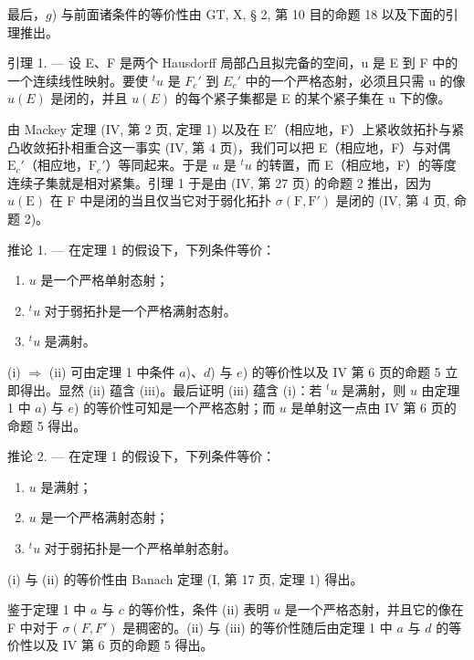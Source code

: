 最后，\(g\)) 与前面诸条件的等价性由 GT, X, § 2, 第 10 目的命题 18 以及下面的引理推出。

引理 1. --- 设 E、F 是两个 Hausdorff 局部凸且拟完备的空间，u 是 E 到 F 中的一个连续线性映射。要使 \({}^t u\) 是 \(F_{c}'\) 到 \(E_{c}'\) 中的一个严格态射，必须且只需 u 的像 \(u(E)\) 是闭的，并且 \(u(E)\) 的每个紧子集都是 E 的某个紧子集在 u 下的像。

由 Mackey 定理 (IV, 第 2 页, 定理 1) 以及在 \(\mathrm{E}'\)（相应地，F）上紧收敛拓扑与紧凸收敛拓扑相重合这一事实 (IV, 第 4 页)，我们可以把 E（相应地，F）与对偶 \(\mathrm{E}_c'\)（相应地，\(\mathrm{F}_c'\)）等同起来。于是 \(u\) 是 \({}^t u\) 的转置，而 E（相应地，F）的等度连续子集就是相对紧集。引理 1 于是由 (IV, 第 27 页) 的命题 2 推出，因为 \(u(\mathrm{E})\) 在 F 中是闭的当且仅当它对于弱化拓扑 \(\sigma(\mathrm{F}, \mathrm{F}')\) 是闭的 (IV, 第 4 页, 命题 2)。

推论 1. --- 在定理 1 的假设下，下列条件等价：

\begin{enumerate}
\def\labelenumi{(\roman{enumi})}
\item
  \(u\) 是一个严格单射态射；
\item
  \({}^{t}u\) 对于弱拓扑是一个严格满射态射。
\item
\({}^{t}u\) 是满射。
\end{enumerate}

(i) \(\Rightarrow\) (ii) 可由定理 1 中条件 \(a\))、\(d\)) 与 \(e\)) 的等价性以及 IV 第 6 页的命题 5 立即得出。显然 (ii) 蕴含 (iii)。最后证明 (iii) 蕴含 (i)：若 \({}^t u\) 是满射，则 \(u\) 由定理 1 中 \(a\)) 与 \(e\)) 的等价性可知是一个严格态射；而 \(u\) 是单射这一点由 IV 第 6 页的命题 5 得出。

推论 2. --- 在定理 1 的假设下，下列条件等价：

\begin{enumerate}
\def\labelenumi{(\roman{enumi})}
\item
  \(u\) 是满射；
\item
  \(u\) 是一个严格满射态射；
\item
  \({}^t u\) 对于弱拓扑是一个严格单射态射。
\end{enumerate}

(i) 与 (ii) 的等价性由 Banach 定理 (I, 第 17 页, 定理 1) 得出。

鉴于定理 1 中 \(a\) 与 \(c\) 的等价性，条件 (ii) 表明 \(u\) 是一个严格态射，并且它的像在 F 中对于 \(\sigma(F, F')\) 是稠密的。(ii) 与 (iii) 的等价性随后由定理 1 中 \(a\) 与 \(d\) 的等价性以及 IV 第 6 页的命题 5 得出。

